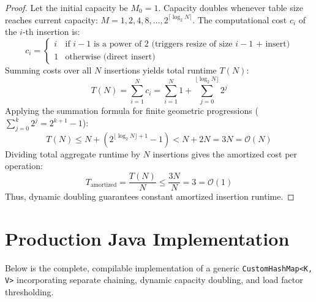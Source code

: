 \documentclass[10pt,twocolumn,letterpaper]{article}
\begin{document}
\begin{proof}
Let the initial capacity be $M_0 = 1$. Capacity doubles whenever table size reaches current capacity: $M = 1, 2, 4, 8, \dots, 2^{\lceil \log_2 N \rceil}$.
The computational cost $c_i$ of the $i$-th insertion is:
\[
c_i = \begin{cases}
i & \text{if } i - 1 \text{ is a power of 2 (triggers resize of size } i - 1 \text{ + insert)} \\
1 & \text{otherwise (direct insert)}
\end{cases}
\]
Summing costs over all $N$ insertions yields total runtime $T(N)$:
\[
T(N) = \sum_{i=1}^N c_i = \sum_{i=1}^N 1 + \sum_{j=0}^{\lfloor \log_2 N \rfloor} 2^j
\]
Applying the summation formula for finite geometric progressions ($\sum_{j=0}^k 2^j = 2^{k+1} - 1$):
\[
T(N) \le N + (2^{\lfloor \log_2 N \rfloor + 1} - 1) < N + 2N = 3N = \mathcal{O}(N)
\]
Dividing total aggregate runtime by $N$ insertions gives the amortized cost per operation:
\[
T_{\text{amortized}} = \frac{T(N)}{N} \le \frac{3N}{N} = 3 = \mathcal{O}(1)
\]
Thus, dynamic doubling guarantees constant amortized insertion runtime.
\end{proof}

\section{Production Java Implementation}
\label{sec:implementation}

Below is the complete, compilable implementation of a generic \texttt{CustomHashMap<K, V>} incorporating separate chaining, dynamic capacity doubling, and load factor thresholding.
\end{document}
